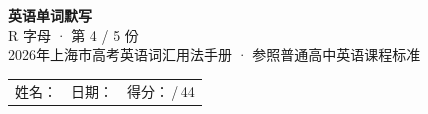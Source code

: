 \documentclass[10pt,a4paper]{article}
\begin{document}
\pagestyle{plain}

\begin{center}
{\LARGE\bfseries 英语单词默写}\\[0.22em]
{\large R 字母 · 第 4 / 5 份}\\[0.18em]
{\small 2026年上海市高考英语词汇用法手册 · 参照普通高中英语课程标准}
\end{center}

\vspace{0.25em}
\noindent\begin{tabular}{@{}p{}@{}p{}@{}p{}@{}}
姓名：\underline{\hspace{2.0cm}} & 日期：\underline{\hspace{2.0cm}} & 得分：\underline{\hspace{1.3cm}}\,/\,44 \\
\end{tabular}

\vspace{0.3em}

\vspace{0.08em}
\end{document}

